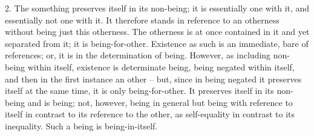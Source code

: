 2. The something preserves itself in its non-being; it is essentially one
with it, and essentially not one with it. It therefore stands in reference to
an otherness without being just this otherness. The otherness is at once
contained in it and yet separated from it; it is being-for-other.
Existence as such is an immediate, bare of references; or, it is in the
determination of being. However, as including non-being within itself,
existence is determinate being, being negated within itself, and then in the
first instance an other – but, since in being negated it preserves itself at the
same time, it is only being-for-other.
It preserves itself in its non-being and is being; not, however, being
in general but being with reference to itself in contrast to its reference
to the other, as self-equality in contrast to its inequality. Such a being is
being-in-itself.

